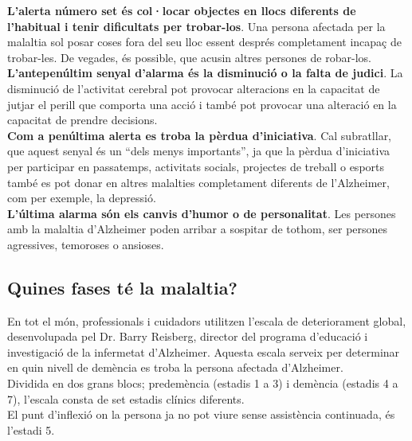 \documentclass[a4paper,12pt]{article}
\begin{document}
\textbf{L'alerta número set és col·locar objectes en llocs diferents de l'habitual i tenir dificultats per trobar-los}. Una persona afectada per la malaltia sol posar coses fora del seu lloc essent després completament incapaç de trobar-les. De vegades, és possible, que acusin altres persones de robar-los.\\
\textbf{L'antepenúltim senyal d'alarma és la disminució o la falta de judici}. La disminució de l'activitat cerebral pot provocar alteracions en la capacitat de jutjar el perill que comporta una acció i també pot provocar una alteració en la capacitat de prendre decisions.\\
\textbf{Com a penúltima alerta es troba la pèrdua d'iniciativa}. Cal subratllar, que aquest senyal és un “dels menys importants”, ja que la pèrdua d'iniciativa per participar en passatemps, activitats socials, projectes de treball o esports també es pot donar en altres malalties completament diferents de l'Alzheimer, com per exemple, la depressió.\\
\textbf{L'última alarma són els canvis d'humor o de personalitat}. Les persones amb la malaltia d'Alzheimer poden arribar a sospitar de tothom, ser persones agressives, temoroses o ansioses.
\subsection*{Quines fases té la malaltia?}
En tot el món, professionals i cuidadors utilitzen l'escala de deteriorament global, desenvolupada pel Dr. Barry Reisberg, director del programa d'educació i investigació de la infermetat d'Alzheimer. Aquesta escala serveix per determinar en quin nivell de demència es troba la persona afectada d'Alzheimer.\\
Dividida en dos grans blocs; predemència (estadis 1 a 3) i demència (estadis 4 a 7), l'escala consta de set estadis clínics diferents.\\
El punt d'inflexió on la persona ja no pot viure sense assistència continuada, és l'estadi 5.
\end{document}
